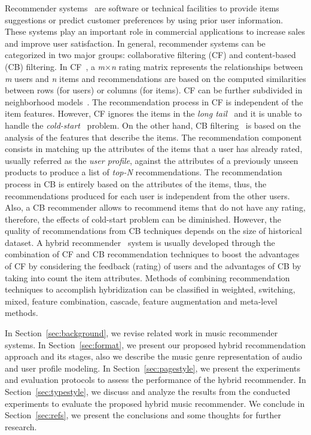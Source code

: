 \documentclass{article}
\begin{document}
Recommender systems~\cite{melville2010recommender} are software or technical facilities to provide items suggestions or predict customer preferences by using prior user information. These systems play an important role in commercial applications to increase sales and improve user satisfaction. In general, recommender systems can be categorized in two major groups: collaborative filtering (CF) and content-based (CB) filtering. In CF~\cite{Yao2015453, Burke2002331}, a \emph{m$\times$n} rating matrix represents the relationships between \textit{m} users and \textit{n} items and recommendations are based on the computed similarities between rows (for users) or columns (for items). CF can be further subdivided in neighborhood models~\cite{Hu2008263}. The recommendation process in CF is independent of the item features. However, CF ignores the items in the \textit{long tail}~\cite{Yin2012896} and it is unable to handle the \textit{cold-start}~\cite{Dai20141760} problem. On the other hand, CB filtering~\cite{Lops2011} is based on the analysis of the features that describe the items. The recommendation component consists in matching up the attributes of the items that a user has already rated, usually referred as the \textit{user profile}, against the attributes of a previously unseen products to produce a list of \emph{top-N} recommendations. The recommendation process in CB is entirely based on the attributes of the items, thus, the recommendations produced for each user is independent from the other users. Also, a CB recommender allows to recommend items that do not have any rating, therefore, the effects of cold-start problem can be diminished. However, the quality of recommendations from CB techniques depends on the size of historical dataset. A hybrid recommender~\cite{Burke2002331} system is usually developed through the combination of CF and CB recommendation techniques to boost the advantages of CF by considering the feedback (rating) of users and the advantages of CB by taking into count the item attributes. Methods of combining recommendation techniques to accomplish hybridization can be classified in weighted, switching, mixed, feature combination, cascade, feature augmentation and meta-level methods.

In Section~\ref{sec:background}, we revise related work in music recommender systems. In Section~\ref{sec:format}, we present our proposed hybrid recommendation approach and its stages, also we describe the music genre representation of audio and user profile modeling. In Section~\ref{sec:pagestyle}, we present the experiments and evaluation protocols to assess the performance of the hybrid recommender. In Section~\ref{sec:typestyle}, we discuss and analyze the results from the conducted experiments to evaluate the proposed hybrid music recommender.  We conclude in Section~\ref{sec:refs}, we present the conclusions and some thoughts for further research.
\end{document}
